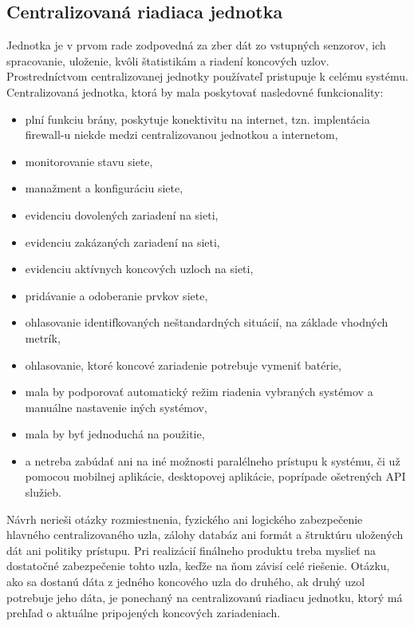 \documentclass[12pt,a4wide,oneside,openright]{report}
\begin{document}
\subsection{Centralizovaná riadiaca jednotka} 
Jednotka je v prvom rade zodpovedná za zber dát zo vstupných senzorov, ich spracovanie, uloženie, kvôli štatistikám a riadení koncových uzlov. Prostredníctvom centralizovanej jednotky používateľ pristupuje k celému systému. Centralizovaná jednotka, ktorá by mala poskytovať nasledovné funkcionality:
\begin{itemize}
	\item plní funkciu brány, poskytuje konektivitu na internet, tzn. implentácia firewall-u niekde medzi centralizovanou jednotkou a internetom,
	\item monitorovanie stavu siete,
	\item manažment a konfiguráciu siete,
	\item evidenciu dovolených zariadení na sieti,
	\item evidenciu zakázaných zariadení na sieti,
	\item evidenciu aktívnych koncových uzloch na sieti,
	\item pridávanie a odoberanie prvkov siete,
	\item ohlasovanie identifkovaných neštandardných situácií, na základe vhodných metrík,
	\item ohlasovanie, ktoré koncové zariadenie potrebuje vymeniť batérie,
	\item mala by podporovať automatický režim riadenia vybraných systémov a manuálne nastavenie iných systémov,
	\item mala by byť jednoduchá na použitie,
	\item a netreba zabúdať ani na iné možnosti paralélneho prístupu k systému, či už pomocou mobilnej aplikácie, desktopovej aplikácie, poprípade ošetrených API služieb.
\end{itemize}
\onehalfspacing

Návrh nerieši otázky rozmiestnenia, fyzického ani logického zabezpečenie hlavného centralizovaného uzla, zálohy databáz ani formát a štruktúru uložených dát ani politiky prístupu. Pri realizácií finálneho produktu treba myslieť na dostatočné zabezpečenie tohto uzla, keďže na ňom závisí celé riešenie.
Otázku, ako sa dostanú dáta z jedného koncového uzla do druhého, ak druhý uzol potrebuje jeho dáta, je ponechaný na centralizovanú riadiacu jednotku, ktorý má prehľad o aktuálne pripojených koncových zariadeniach.
\end{document}
